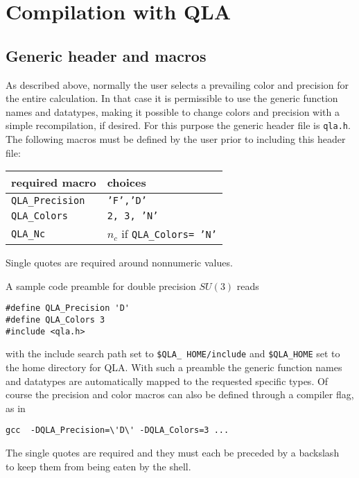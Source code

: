 \documentclass{article}
\newcommand{\ttdash}{{\tt \_}}
\newcommand{\qlaNcMacro}{{\tt QLA}\ttdash{\tt Nc }}
\newcommand{\qlaPrecisionMacro}{{\tt QLA}\ttdash{\tt Precision}}
\newcommand{\qlaColorsMacro}{{\tt QLA}\ttdash{\tt Colors}}
\begin{document}
\section{Compilation with QLA}

\subsection{Generic header and macros}

As described above, normally the user selects a prevailing color and
precision for the entire calculation.  In that case it is permissible
to use the generic function names and datatypes, making it possible to
change colors and precision with a simple recompilation, if desired.
For this purpose the generic header file is {\tt qla.h}.  The
following macros must be defined by the user prior to including this
header file:

\begin{center}
\begin{tabular}{|l|l|}
\hline
 required macro & choices \\
\hline
 \qlaPrecisionMacro & {\tt 'F','D'} \\
 \qlaColorsMacro    & {\tt 2, 3, 'N'} \\
 \qlaNcMacro        & $n_c$ if {\tt \qlaColorsMacro = 'N'} \\
\hline
\end{tabular}
\end{center}
%
Single quotes are required around nonnumeric values.  

A sample code preamble for double precision $SU(3)$ reads
%
\begin{verbatim}
#define QLA_Precision 'D'
#define QLA_Colors 3
#include <qla.h>
\end{verbatim}
%
with the include search path set to {\tt \$QLA}\ttdash{\tt
HOME/include} and {\tt \$QLA}\ttdash{\tt HOME} set to the home
directory for QLA\@.  With such a preamble the generic function names
and datatypes are automatically mapped to the requested specific
types.  Of course the precision and color macros can also be defined
through a compiler flag, as in
%
\begin{verbatim}
gcc  -DQLA_Precision=\'D\' -DQLA_Colors=3 ...
\end{verbatim}
%
The single quotes are required and they must each be preceded by a
backslash {\tt \\} to keep them from being eaten by the shell.
\end{document}
